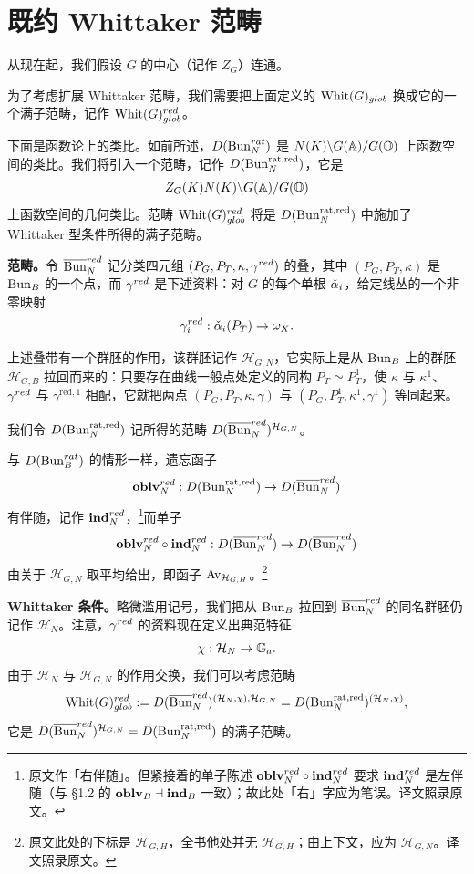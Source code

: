 \section{既约 Whittaker 范畴}

从现在起，我们假设 $G$ 的中心（记作 $Z_G$）连通。

为了考虑扩展 Whittaker 范畴，我们需要把上面定义的 $\mathrm{Whit}(G)_{glob}$ 换成它的一个满子范畴，记作 $\mathrm{Whit}(G)^{red}_{glob}$。

下面是函数论上的类比。如前所述，$D(\operatorname{Bun}^{rat}_N)$ 是 $N(K)\backslash G(\mathbb{A})/G(\mathbb O)$ 上函数空间的类比。我们将引入一个范畴，记作 $D(\operatorname{Bun}^{\mathrm{rat},\mathrm{red}}_N)$，它是
\[
  Z_G(K)N(K)\backslash G(\mathbb{A})/G(\mathbb O)
\]
上函数空间的几何类比。范畴 $\mathrm{Whit}(G)^{red}_{glob}$ 将是 $D(\operatorname{Bun}^{\mathrm{rat},\mathrm{red}}_N)$ 中施加了 Whittaker 型条件所得的满子范畴。

\textbf{范畴。}令 $\overline{\operatorname{Bun}}^{red}_N$ 记分类四元组 $(P_G,P_T,\kappa,\gamma^{red})$ 的叠，其中 $(P_G,P_T,\kappa)$ 是 $\operatorname{Bun}_B$ 的一个点，而 $\gamma^{red}$ 是下述资料：对 $G$ 的每个单根 $\check\alpha_i$，给定线丛的一个非零映射
\[
  \gamma_i^{red} : \check\alpha_i(P_T)\to\omega_X .
\]

上述叠带有一个群胚的作用，该群胚记作 $\mathcal H_{G,N}$，它实际上是从 $\operatorname{Bun}_B$ 上的群胚 $\mathcal H_{G,B}$ 拉回而来的：只要存在曲线一般点处定义的同构 $P_T\simeq P_T^1$，使 $\kappa$ 与 $\kappa^1$、$\gamma^{red}$ 与 $\gamma^{\mathrm{red},1}$ 相配，它就把两点 $(P_G,P_T,\kappa,\gamma)$ 与 $(P_G,P_T^1,\kappa^1,\gamma^1)$ 等同起来。

我们令 $D(\operatorname{Bun}^{\mathrm{rat},\mathrm{red}}_N)$ 记所得的范畴 $D(\overline{\operatorname{Bun}}^{red}_N)^{\mathcal H_{G,N}}$。

与 $D(\operatorname{Bun}^{rat}_B)$ 的情形一样，遗忘函子
\[
  \mathbf{oblv}^{red}_N : D(\operatorname{Bun}^{\mathrm{rat},\mathrm{red}}_N)\to D(\overline{\operatorname{Bun}}^{red}_N)
\]
有伴随，记作 $\mathbf{ind}^{red}_N$，\footnote{原文作「右伴随」。但紧接着的单子陈述 $\mathbf{oblv}^{red}_N\circ\mathbf{ind}^{red}_N$ 要求 $\mathbf{ind}^{red}_N$ 是左伴随（与 §1.2 的 $\mathbf{oblv}_B\dashv\mathbf{ind}_B$ 一致）；故此处「右」字应为笔误。译文照录原文。}而单子
\[
  \mathbf{oblv}^{red}_N\circ\mathbf{ind}^{red}_N : D(\overline{\operatorname{Bun}}^{red}_N)\to D(\overline{\operatorname{Bun}}^{red}_N)
\]
由关于 $\mathcal H_{G,N}$ 取平均给出，即函子 $\mathrm{Av}_{\mathcal H_{G,H}}$。\footnote{原文此处的下标是 $\mathcal H_{G,H}$，全书他处并无 $\mathcal H_{G,H}$；由上下文，应为 $\mathcal H_{G,N}$。译文照录原文。}

\textbf{Whittaker 条件。}略微滥用记号，我们把从 $\operatorname{Bun}_B$ 拉回到 $\overline{\operatorname{Bun}}^{red}_N$ 的同名群胚仍记作 $\mathcal H_N$。注意，$\gamma^{red}$ 的资料现在定义出典范特征
\[
  \chi : \mathcal H_N\to\mathbb{G}_a .
\]
由于 $\mathcal H_N$ 与 $\mathcal H_{G,N}$ 的作用交换，我们可以考虑范畴
\[
  \mathrm{Whit}(G)^{red}_{glob} :=
  D(\overline{\operatorname{Bun}}^{red}_N)^{(\mathcal H_N,\chi),\mathcal H_{G,N}}
  = D(\operatorname{Bun}^{\mathrm{rat},\mathrm{red}}_N)^{(\mathcal H_N,\chi)},
\]
它是 $D(\overline{\operatorname{Bun}}^{red}_N)^{\mathcal H_{G,N}}=D(\operatorname{Bun}^{\mathrm{rat},\mathrm{red}}_N)$ 的满子范畴。


